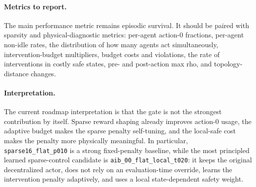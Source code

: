 \paragraph{Metrics to report.}
The main performance metric remains episodic survival. It should be paired with
sparsity and physical-diagnostic metrics: per-agent action-0 fractions,
per-agent non-idle rates, the distribution of how many agents act
simultaneously, intervention-budget multipliers, budget costs and violations,
the rate of interventions in costly safe states, pre- and post-action max rho,
and topology-distance changes.

\paragraph{Interpretation.}
The current roadmap interpretation is that the gate is not the strongest
contribution by itself. Sparse reward shaping already improves action-0 usage,
the adaptive budget makes the sparse penalty self-tuning, and the local-safe
cost makes the penalty more physically meaningful. In particular,
\texttt{sparse16\_flat\_p010} is a strong fixed-penalty baseline, while the
most principled learned sparse-control candidate is
\texttt{aib\_00\_flat\_local\_t020}: it keeps the original decentralized actor,
does not rely on an evaluation-time override, learns the intervention penalty
adaptively, and uses a local state-dependent safety weight.

